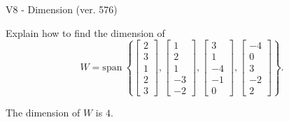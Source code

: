 \begin{exercise}
  \begin{exerciseTitle}V8 - Dimension (ver. 576)\end{exerciseTitle}
  \begin{exerciseStatement}
    Explain how to find the dimension of 
\[W=\mathrm{span}\ \left\{\left[\begin{array}{r}
2 \\
3 \\
1 \\
2 \\
3
\end{array}\right] , \left[\begin{array}{r}
1 \\
2 \\
1 \\
-3 \\
-2
\end{array}\right] , \left[\begin{array}{r}
3 \\
1 \\
-4 \\
-1 \\
0
\end{array}\right] , \left[\begin{array}{r}
-4 \\
0 \\
3 \\
-2 \\
2
\end{array}\right]\right\}.\]



  \end{exerciseStatement}
  \begin{exerciseAnswer}
   The dimension of \(W\) is  \(4\).
  


  \end{exerciseAnswer}
\end{exercise}
